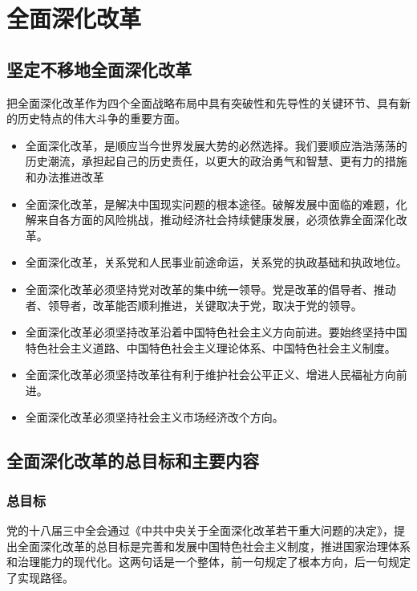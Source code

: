 \section{全面深化改革}
    \subsection{坚定不移地全面深化改革}
        把全面深化改革作为四个全面战略布局中具有突破性和先导性的关键环节、具有新的历史特点的伟大斗争的重要方面。
        \begin{itemize}
            \item 全面深化改革，是顺应当今世界发展大势的必然选择。我们要顺应浩浩荡荡的历史潮流，承担起自己的历史责任，以更大的政治勇气和智慧、更有力的措施和办法推进改革
            \item 全面深化改革，是解决中国现实问题的根本途径。破解发展中面临的难题，化解来自各方面的风险挑战，推动经济社会持续健康发展，必须依靠全面深化改革。
            \item 全面深化改革，关系党和人民事业前途命运，关系党的执政基础和执政地位。
        \end{itemize}

        \begin{itemize}
            \item 全面深化改革必须坚持党对改革的集中统一领导。党是改革的倡导者、推动者、领导者，改革能否顺利推进，关键取决于党，取决于党的领导。
            \item 全面深化改革必须坚持改革沿着中国特色社会主义方向前进。要始终坚持中国特色社会主义道路、中国特色社会主义理论体系、中国特色社会主义制度。
            \item 全面深化改革必须坚持改革往有利于维护社会公平正义、增进人民福祉方向前进。
            \item 全面深化改革必须坚持社会主义市场经济改个方向。
        \end{itemize}

    \subsection{全面深化改革的总目标和主要内容}
        \subsubsection{总目标}
            党的十八届三中全会通过《中共中央关于全面深化改革若干重大问题的决定》，提出全面深化改革的总目标是完善和发展中国特色社会主义制度，推进国家治理体系和治理能力的现代化。这两句话是一个整体，前一句规定了根本方向，后一句规定了实现路径。

